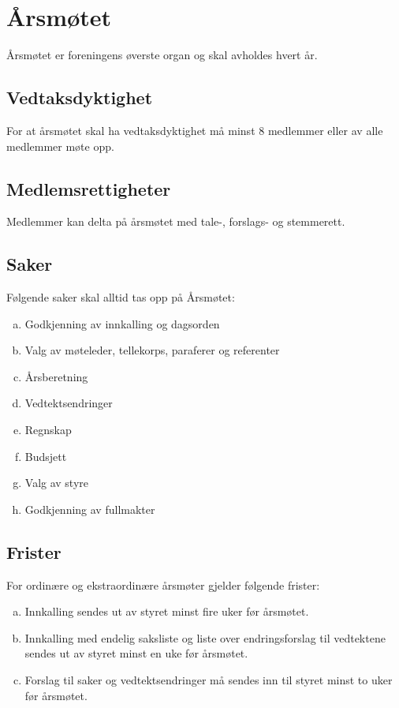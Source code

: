 \chapter{Årsmøtet}
Årsmøtet er foreningens øverste organ og skal avholdes hvert år.

\section{Vedtaksdyktighet}
For at årsmøtet skal ha vedtaksdyktighet må minst 8 medlemmer eller  av alle medlemmer møte opp.

\section{Medlemsrettigheter}
Medlemmer kan delta på årsmøtet med tale-, forslags- og stemmerett.

\section{Saker}
Følgende saker skal alltid tas opp på Årsmøtet:
\begin{enumerate}[a.]
    \item Godkjenning av innkalling og dagsorden
    \item Valg av møteleder, tellekorps, paraferer og referenter
    \item Årsberetning
    \item Vedtektsendringer
    \item Regnskap
    \item Budsjett
    \item Valg av styre
    \item Godkjenning av fullmakter
\end{enumerate}

\section{Frister}
For ordinære og ekstraordinære årsmøter gjelder følgende frister:
\begin{enumerate}[a.]
    \item Innkalling sendes ut av styret minst fire uker før årsmøtet.
    \item Innkalling med endelig saksliste og liste over endringsforslag til vedtektene sendes ut av styret minst en uke før årsmøtet.
    \item Forslag til saker og vedtektsendringer må sendes inn til styret minst to uker før årsmøtet.
\end{enumerate}

